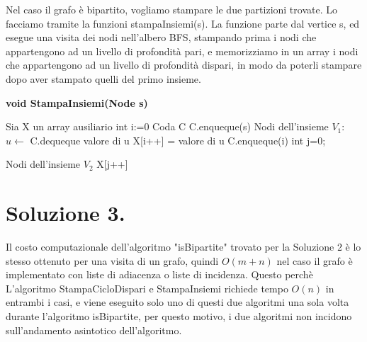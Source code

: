 \documentclass{article}
\begin{document}
Nel caso il grafo è bipartito, vogliamo stampare le due partizioni trovate. 
Lo facciamo tramite la funzioni stampaInsiemi(s). La funzione parte 
dal vertice s, ed esegue una visita dei nodi nell'albero BFS, stampando prima i 
nodi che appartengono ad un livello di profondità pari, e memorizziamo in un array 
i nodi che appartengono ad un livello di profondità dispari, in modo da poterli 
stampare dopo aver stampato quelli del primo insieme.

\begin{algorithm}
\begin{algorithmic}[1]
\STATE \textbf{void StampaInsiemi(Node s)}
\vspace{1em}

\STATE Sia X un array ausiliario
\STATE int i:=0
\STATE Coda C
\STATE C.enqueque(s) 
\PRINT Nodi dell'insieme $V_{1}:$
  \STATE $u \leftarrow$ C.dequeque
      \PRINT valore di u
    \ELSE 
      \STATE X[i++] = valore di u
    \ENDIF
  \ENDIF
    \STATE C.enqueque(i)
  \ENDFOR
\ENDWHILE 
\STATE int j=0; 

  \PRINT Nodi dell'insieme $V_{2}$
\PRINT X[j++]
\ENDWHILE
\end{algorithmic} 
\end{algorithm}

\newpage

\section{Soluzione 3.}

Il costo computazionale dell'algoritmo "isBipartite" trovato per la Soluzione 2
è lo stesso ottenuto per una visita di un grafo, quindi $O(m+n)$ nel caso il grafo è 
implementato con liste di adiacenza o liste di incidenza. 
Questo perchè 
L'algoritmo StampaCicloDispari e StampaInsiemi richiede tempo $O(n)$ in entrambi i 
casi, e viene eseguito solo uno di questi due algoritmi una sola volta durante l'algoritmo isBipartite,
per questo motivo, i due algoritmi non incidono sull'andamento asintotico dell'algoritmo.
\end{document}

